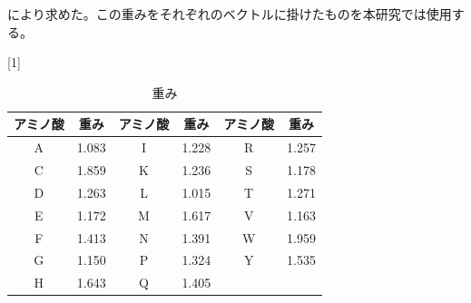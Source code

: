 \documentclass[a4paper,12pt]{jsreport}
\begin{document}
により求めた。この重みをそれぞれのベクトルに掛けたものを本研究では使用する。


\begin{table}[H]
\centering
\caption{重み}
\scalebox{1}[1]{
\begin{tabular}{|cc|cc|cc|} \hline
アミノ酸 & 重み & アミノ酸 & 重み & アミノ酸 & 重み\\ \hline
A &1.083 &I &1.228 &R &1.257 \\[-2mm]
C &1.859 &K &1.236 &S &1.178 \\[-2mm]
D &1.263 &L &1.015 &T &1.271 \\[-2mm]
E &1.172 &M &1.617 &V &1.163 \\[-2mm]
F &1.413 &N &1.391 &W &1.959 \\[-2mm]
G &1.150 &P &1.324 &Y &1.535 \\[-2mm]
H &1.643 &Q &1.405 &\ &\ \\ \hline
\end{tabular}
}
\end{table}

\end{document}
